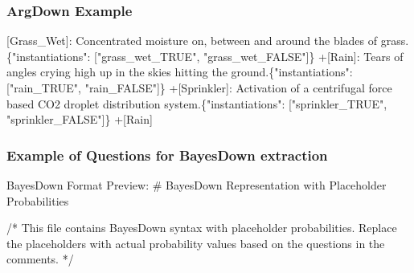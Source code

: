 \documentclass[
  11pt,
  letterpaper,
]{book}
\newenvironment{Shaded}{\begin{snugshade}}{\end{snugshade}}
\newcommand{\AnnotationTok}[1]{\textcolor[rgb]{0.37,0.37,0.37}{#1}}
\newcommand{\CommentTok}[1]{\textcolor[rgb]{0.37,0.37,0.37}{#1}}
\newcommand{\FunctionTok}[1]{\textcolor[rgb]{0.28,0.35,0.67}{#1}}
\newcommand{\NormalTok}[1]{\textcolor[rgb]{0.00,0.23,0.31}{#1}}
\newcommand{\OtherTok}[1]{\textcolor[rgb]{0.00,0.23,0.31}{#1}}
\begin{document}
\begin{landscape}

\subsubsection*{ArgDown Example}\label{argdown-example}

\begin{Shaded}
\begin{Highlighting}[]
\OtherTok{[Grass\_Wet]: }\NormalTok{Concentrated moisture on, between and around the blades of grass.\{"instantiations": }\CommentTok{[}\OtherTok{"grass\_wet\_TRUE", "grass\_wet\_FALSE"}\CommentTok{]}\NormalTok{\}    }
\NormalTok{    +}\CommentTok{[}\OtherTok{Rain}\CommentTok{]}\NormalTok{: Tears of angles crying high up in the skies hitting the ground.\{"instantiations": }\CommentTok{[}\OtherTok{"rain\_TRUE", "rain\_FALSE"}\CommentTok{]}\NormalTok{\}}
\NormalTok{    +}\CommentTok{[}\OtherTok{Sprinkler}\CommentTok{]}\NormalTok{: Activation of a centrifugal force based CO2 droplet distribution system.\{"instantiations": }\CommentTok{[}\OtherTok{"sprinkler\_TRUE", "sprinkler\_FALSE"}\CommentTok{]}\NormalTok{\}}
\NormalTok{        +}\CommentTok{[}\OtherTok{Rain}\CommentTok{]}
\end{Highlighting}
\end{Shaded}

\subsubsection*{Example of Questions for BayesDown
extraction}\label{example-of-questions-for-bayesdown-extraction}

\begin{Shaded}
\begin{Highlighting}[]
\AnnotationTok{BayesDown Format Preview:}
\FunctionTok{\# BayesDown Representation with Placeholder Probabilities}

\NormalTok{/* This file contains BayesDown syntax with placeholder probabilities.}
\NormalTok{   Replace the placeholders with actual probability values based on the }
\NormalTok{   questions in the comments. */}


\end{Highlighting}
\end{Shaded}
\end{landscape}
\end{document}
